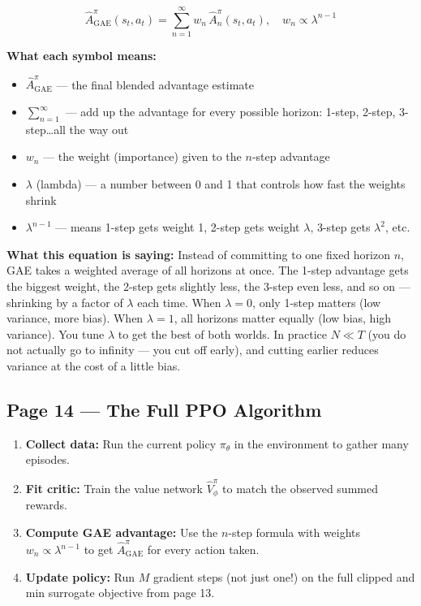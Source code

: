 \[
\hat{A}^\pi_\mathrm{GAE}(s_t, a_t) = \sum_{n=1}^{\infty} w_n\, \hat{A}^\pi_n(s_t, a_t), \quad w_n \propto \lambda^{n-1}
\]

\textbf{What each symbol means:}
\begin{itemize}
    \item $\hat{A}^\pi_\mathrm{GAE}$ --- the final blended advantage estimate
    \item $\sum_{n=1}^{\infty}$ --- add up the advantage for every possible horizon: 1-step, 2-step, 3-step\ldots all the way out
    \item $w_n$ --- the weight (importance) given to the $n$-step advantage
    \item $\lambda$ (lambda) --- a number between 0 and 1 that controls how fast the weights shrink
    \item $\lambda^{n-1}$ --- means 1-step gets weight 1, 2-step gets weight $\lambda$, 3-step gets $\lambda^2$, etc.
\end{itemize}

\textbf{What this equation is saying:}
Instead of committing to one fixed horizon $n$, GAE takes a weighted average of all horizons at once. The 1-step advantage gets the biggest weight, the 2-step gets slightly less, the 3-step even less, and so on --- shrinking by a factor of $\lambda$ each time. When $\lambda = 0$, only 1-step matters (low variance, more bias). When $\lambda = 1$, all horizons matter equally (low bias, high variance). You tune $\lambda$ to get the best of both worlds. In practice $N \ll T$ (you do not actually go to infinity --- you cut off early), and cutting earlier reduces variance at the cost of a little bias.

\subsection*{Page 14 --- The Full PPO Algorithm}

\begin{enumerate}
    \item \textbf{Collect data:} Run the current policy $\pi_\theta$ in the environment to gather many episodes.
    \item \textbf{Fit critic:} Train the value network $\hat{V}^\pi_\phi$ to match the observed summed rewards.
    \item \textbf{Compute GAE advantage:} Use the $n$-step formula with weights $w_n \propto \lambda^{n-1}$ to get $\hat{A}^\pi_\mathrm{GAE}$ for every action taken.
    \item \textbf{Update policy:} Run $M$ gradient steps (not just one!) on the full clipped and min surrogate objective from page 13.
\end{enumerate}

